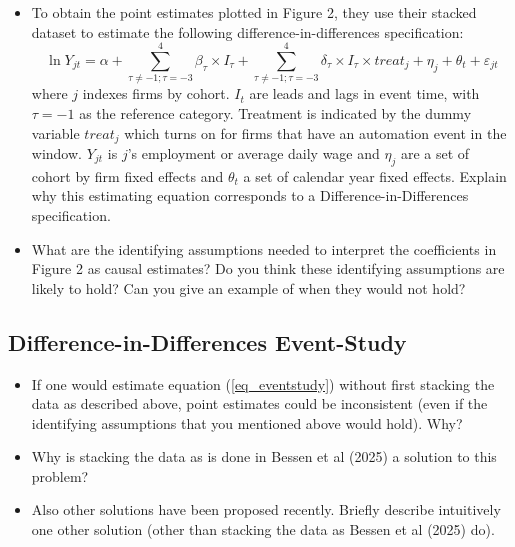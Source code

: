 \documentclass[a4paper,12pt]{article}
\begin{document}
\begin{itemize}

\item[(3.1)] To obtain the point estimates plotted in Figure 2, they use their stacked dataset to estimate the following difference-in-differences specification:
\begin{equation} \label{eq_eventstudy}
\ln Y_{jt} = \alpha + \sum_{\tau\neq-1;\tau=-3}^{4}\beta_{\tau}\times I_{\tau} + \sum_{\tau\neq-1;\tau=-3}^{4}\delta_{\tau}\times I_{\tau} \times treat_j +  \eta_j + \theta_t + \varepsilon_{jt} \tag{3.1}
\end{equation}
where $j$ indexes firms by cohort. $I_{t}$ are leads and lags in event time, with $\tau=-1$ as the reference category. Treatment is indicated by the dummy variable $treat_j$ which turns on for firms that have an automation event in the window. $Y_{jt}$ is $j$'s employment or average daily wage and $\eta_j$ are a set of cohort by firm fixed effects and $\theta_t$ a set of calendar year fixed effects. Explain why this estimating equation corresponds to a Difference-in-Differences specification. 

\item[(3.2)] What are the identifying assumptions needed to interpret the coefficients in Figure 2 as causal estimates? Do you think these identifying assumptions are likely to hold? Can you give an example of when they would not hold?

\end{itemize}

\subsection{Difference-in-Differences Event-Study}

\begin{itemize}

\item[(3.3)] If one would estimate equation (\ref{eq_eventstudy}) without first stacking the data as described above, point estimates could be inconsistent (even if the identifying assumptions that you mentioned above would hold). Why?

\item[(3.4)] Why is stacking the data as is done in Bessen et al (2025) a solution to this problem?

\item[(3.5)] Also other solutions have been proposed recently. Briefly describe intuitively one other solution (other than stacking the data as Bessen et al (2025) do).

\end{itemize}
\end{document}
